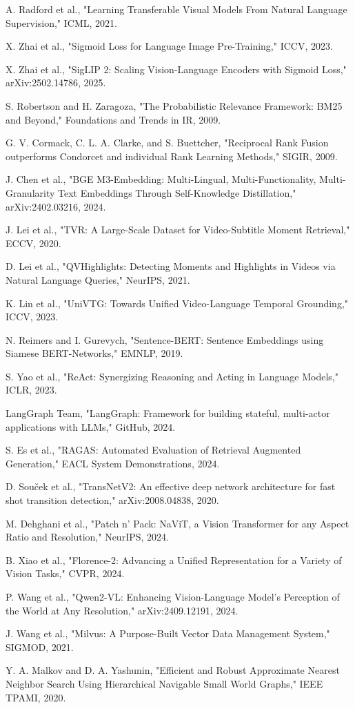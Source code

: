 \documentclass[12pt,a4paper,onecolumn]{article}
\begin{document}
\begin{enumerate}[label={[\arabic*]}]
  \item A. Radford et al., "Learning Transferable Visual Models From Natural Language Supervision," ICML, 2021.
  \item X. Zhai et al., "Sigmoid Loss for Language Image Pre-Training," ICCV, 2023.
  \item X. Zhai et al., "SigLIP 2: Scaling Vision-Language Encoders with Sigmoid Loss," arXiv:2502.14786, 2025.
  \item S. Robertson and H. Zaragoza, "The Probabilistic Relevance Framework: BM25 and Beyond," Foundations and Trends in IR, 2009.
  \item G. V. Cormack, C. L. A. Clarke, and S. Buettcher, "Reciprocal Rank Fusion outperforms Condorcet and individual Rank Learning Methods," SIGIR, 2009.
  \item J. Chen et al., "BGE M3-Embedding: Multi-Lingual, Multi-Functionality, Multi-Granularity Text Embeddings Through Self-Knowledge Distillation," arXiv:2402.03216, 2024.
  \item J. Lei et al., "TVR: A Large-Scale Dataset for Video-Subtitle Moment Retrieval," ECCV, 2020.
  \item D. Lei et al., "QVHighlights: Detecting Moments and Highlights in Videos via Natural Language Queries," NeurIPS, 2021.
  \item K. Lin et al., "UniVTG: Towards Unified Video-Language Temporal Grounding," ICCV, 2023.
  \item N. Reimers and I. Gurevych, "Sentence-BERT: Sentence Embeddings using Siamese BERT-Networks," EMNLP, 2019.
  \item S. Yao et al., "ReAct: Synergizing Reasoning and Acting in Language Models," ICLR, 2023.
  \item LangGraph Team, "LangGraph: Framework for building stateful, multi-actor applications with LLMs," GitHub, 2024.
  \item S. Es et al., "RAGAS: Automated Evaluation of Retrieval Augmented Generation," EACL System Demonstrations, 2024.
  \item D. Souček et al., "TransNetV2: An effective deep network architecture for fast shot transition detection," arXiv:2008.04838, 2020.
  \item M. Dehghani et al., "Patch n' Pack: NaViT, a Vision Transformer for any Aspect Ratio and Resolution," NeurIPS, 2024.
  \item B. Xiao et al., "Florence-2: Advancing a Unified Representation for a Variety of Vision Tasks," CVPR, 2024.
  \item P. Wang et al., "Qwen2-VL: Enhancing Vision-Language Model's Perception of the World at Any Resolution," arXiv:2409.12191, 2024.
  \item J. Wang et al., "Milvus: A Purpose-Built Vector Data Management System," SIGMOD, 2021.
  \item Y. A. Malkov and D. A. Yashunin, "Efficient and Robust Approximate Nearest Neighbor Search Using Hierarchical Navigable Small World Graphs," IEEE TPAMI, 2020.
\end{enumerate}
\end{document}
